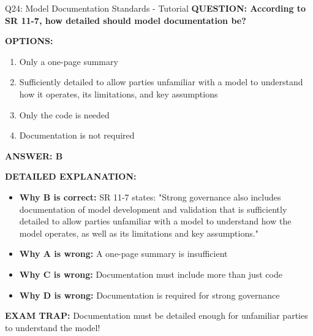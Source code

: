 \documentclass[8pt]{beamer}
\begin{document}
	\begin{frame}{Q24: Model Documentation Standards - Tutorial}
		\fontsize{6.5}{7.5}\selectfont
		\textbf{QUESTION: According to SR 11-7, how detailed should model documentation be?}
		
		\vspace{0.1cm}
		\textbf{OPTIONS:}
		\begin{enumerate}
			\item Only a one-page summary
			\item Sufficiently detailed to allow parties unfamiliar with a model to understand how it operates, its limitations, and key assumptions
			\item Only the code is needed
			\item Documentation is not required
		\end{enumerate}
		
		\vspace{0.1cm}
		\textcolor{myblue}{\textbf{ANSWER: B}}
		
		\vspace{0.1cm}
		\textbf{DETAILED EXPLANATION:}
		\begin{itemize}
			\item \textbf{Why B is correct:} SR 11-7 states: "Strong governance also includes documentation of model development and validation that is sufficiently detailed to allow parties unfamiliar with a model to understand how the model operates, as well as its limitations and key assumptions."
			\item \textbf{Why A is wrong:} A one-page summary is insufficient
			\item \textbf{Why C is wrong:} Documentation must include more than just code
			\item \textbf{Why D is wrong:} Documentation is required for strong governance
		\end{itemize}
		
		\textcolor{myred}{\textbf{EXAM TRAP:}} Documentation must be \textcolor{myblue}{detailed enough for unfamiliar parties to understand the model}!
	\end{frame}
	
\end{document}
